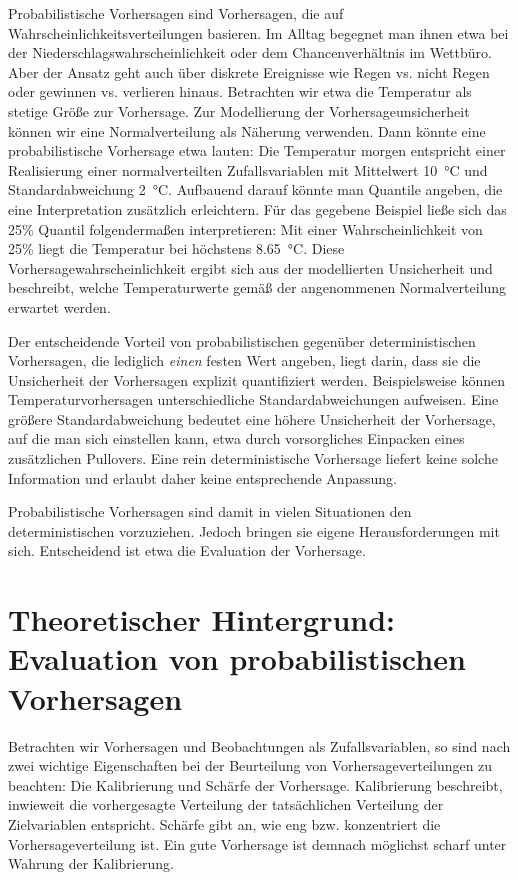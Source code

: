 \documentclass{article}
\numberwithin{equation}{section}
\begin{document}
Probabilistische Vorhersagen sind Vorhersagen, die auf Wahrscheinlichkeitsverteilungen basieren. Im Alltag begegnet man ihnen etwa bei der Niederschlagswahrscheinlichkeit oder dem Chancenverhältnis im Wettbüro. Aber der Ansatz geht auch über diskrete Ereignisse wie Regen vs. nicht Regen oder gewinnen vs. verlieren hinaus. Betrachten wir etwa die Temperatur als stetige Größe zur Vorhersage. Zur Modellierung der Vorhersageunsicherheit können wir eine Normalverteilung als Näherung verwenden. Dann könnte eine probabilistische Vorhersage etwa lauten: Die Temperatur morgen entspricht einer Realisierung einer normalverteilten Zufallsvariablen mit Mittelwert \SI{10}{\celsius} und Standardabweichung \SI{2}{\celsius}. Aufbauend darauf könnte man Quantile angeben, die eine Interpretation zusätzlich erleichtern. Für das gegebene Beispiel ließe sich das 25\% Quantil folgendermaßen interpretieren: Mit einer Wahrscheinlichkeit von 25\% liegt die Temperatur bei höchstens \SI{8,65}{\celsius}. Diese Vorhersagewahrscheinlichkeit ergibt sich aus der modellierten Unsicherheit und beschreibt, welche Temperaturwerte gemäß der angenommenen Normalverteilung erwartet werden.

Der entscheidende Vorteil von probabilistischen gegenüber deterministischen Vorhersagen, die lediglich \textit{einen} festen Wert angeben, liegt darin, dass sie die Unsicherheit der Vorhersagen explizit quantifiziert werden. Beispielsweise können Temperaturvorhersagen unterschiedliche Standardabweichungen aufweisen. Eine größere Standardabweichung bedeutet eine höhere Unsicherheit der Vorhersage, auf die man sich einstellen kann, etwa durch vorsorgliches Einpacken eines zusätzlichen Pullovers. Eine rein deterministische Vorhersage liefert keine solche Information und erlaubt daher keine entsprechende Anpassung.

Probabilistische Vorhersagen sind damit in vielen Situationen den deterministischen vorzuziehen. Jedoch bringen sie eigene Herausforderungen mit sich. Entscheidend ist etwa die Evaluation der Vorhersage. 

\section{Theoretischer Hintergrund: Evaluation von probabilistischen Vorhersagen}\label{sec:eval}
Betrachten wir Vorhersagen und Beobachtungen als Zufallsvariablen, so sind nach \textcite{gneiting_probabilistic_2014} zwei wichtige Eigenschaften bei der Beurteilung von Vorhersageverteilungen zu beachten: Die Kalibrierung und Schärfe der Vorhersage. Kalibrierung beschreibt, inwieweit die vorhergesagte Verteilung der tatsächlichen Verteilung der Zielvariablen entspricht. Schärfe gibt an, wie eng bzw. konzentriert die Vorhersageverteilung ist. Ein gute Vorhersage ist demnach möglichst scharf unter Wahrung der Kalibrierung.
\end{document}
